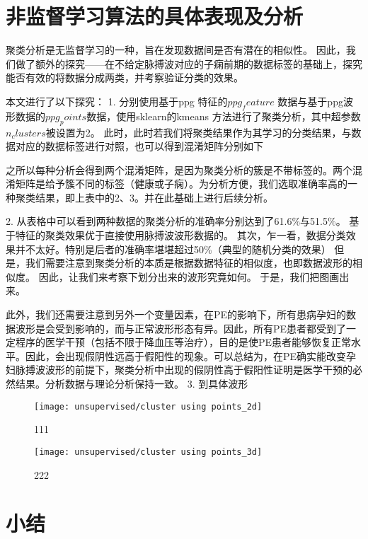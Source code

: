 \section{非监督学习算法的具体表现及分析}
聚类分析是无监督学习的一种，旨在发现数据间是否有潜在的相似性\cite{Liu2018,Li2017}。
因此，我们做了额外的探究——在不给定脉搏波对应的子痫前期的数据标签的基础上，探究能否有效的将数据分成两类，并考察验证分类的效果。

本文进行了以下探究：
1.	分别使用基于ppg 特征的$ppg_feature$ 数据与基于ppg波形数据的$ppg_points $数据，使用sklearn的kmeans 方法进行了聚类分析，其中超参数$n_clusters$被设置为2。
此时，此时若我们将聚类结果作为其学习的分类结果，与数据对应的数据标签进行对照，也可以得到混淆矩阵分别如下

之所以每种分析会得到两个混淆矩阵，是因为聚类分析的簇是不带标签的。两个混淆矩阵是给予簇不同的标签（健康或子痫）。为分析方便，我们选取准确率高的一种聚类结果，即上表中的2、3。并在此基础上进行后续分析。

2.	从表格中可以看到两种数据的聚类分析的准确率分别达到了61.6\%与51.5\%。
基于特征的聚类效果优于直接使用脉搏波波形数据的。
其次，乍一看，数据分类效果并不太好。特别是后者的准确率堪堪超过50\%（典型的随机分类的效果）
但是，我们需要注意到聚类分析的本质是根据数据特征的相似度，也即数据波形的相似度。
因此，让我们来考察下划分出来的波形究竟如何。
于是，我们把图画出来。

此外，我们还需要注意到另外一个变量因素，在PE的影响下，所有患病孕妇的数据波形是会受到影响的，而与正常波形形态有异。因此，所有PE患者都受到了一定程序的医学干预（包括不限于降血压等治疗），目的是使PE患者能够恢复正常水平。因此，会出现假阴性远高于假阳性的现象。可以总结为，在PE确实能改变孕妇脉搏波波形的前提下，聚类分析中出现的假阴性高于假阳性证明是医学干预的必然结果。分析数据与理论分析保持一致。
3.	到具体波形

\begin{figure}[htbp]
    \centering
    \texttt{[image: unsupervised/cluster using points\_2d]}
    \caption[]{\label{fig:cluster2d}111}
\end{figure}
\begin{figure}[htbp]
    \centering
    \texttt{[image: unsupervised/cluster using points\_3d]}
    \caption[]{\label{fig:cluster3d}222}
\end{figure}
\section{小结}
